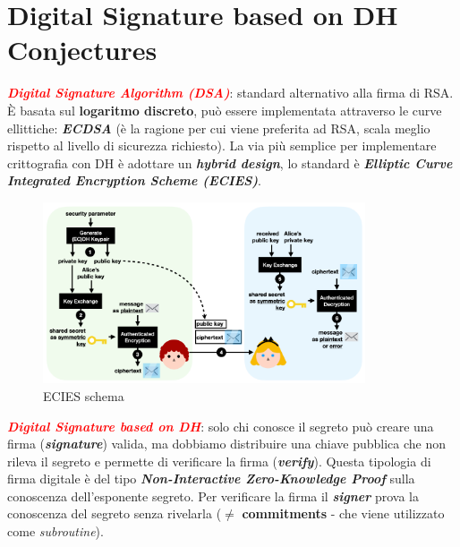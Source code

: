 \section{Digital Signature based on DH Conjectures}

\begin{flushleft}
    \textcolor{red}{\textbf{\textit{Digital Signature Algorithm (DSA)}}}: standard alternativo alla firma di RSA. È basata sul \textbf{logaritmo discreto}, può essere implementata attraverso le curve ellittiche: \textbf{\textit{ECDSA}} (è la ragione per cui viene preferita ad RSA, scala meglio rispetto al livello di sicurezza richiesto). La via più semplice per implementare crittografia con DH è adottare un \textbf{\textit{hybrid design}}, lo standard è \textbf{\textit{Elliptic Curve Integrated Encryption Scheme (ECIES)}}.

    \begin{figure}[h]
        \centering
        \includegraphics[width=0.85\textwidth]{img/ecies.png}
        \caption{ECIES schema}
    \end{figure}

    \medskip

    \textcolor{red}{\textbf{\textit{Digital Signature based on DH}}}: solo chi conosce il segreto può creare una firma (\textbf{\textit{signature}}) valida, ma dobbiamo distribuire una chiave pubblica che non rileva il segreto e permette di verificare la firma (\textbf{\textit{verify}}). Questa tipologia di firma digitale è del tipo \textbf{\textit{Non-Interactive Zero-Knowledge Proof}} sulla conoscenza dell'esponente segreto. Per verificare la firma il \textbf{\textit{signer}} prova la conoscenza del segreto senza rivelarla ($\neq$ \textbf{commitments} - che viene utilizzato come \textit{subroutine}).


\end{flushleft}
